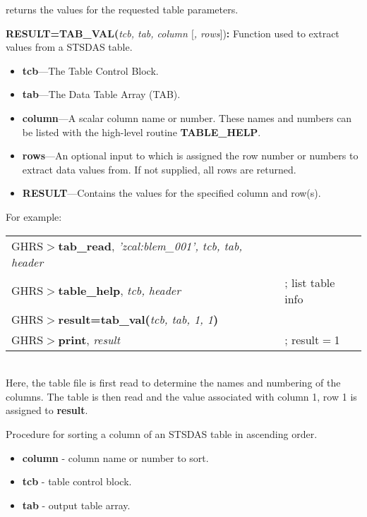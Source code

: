 \begin{description}
\noindent
returns the values for the requested table parameters.
%
\item {\bf RESULT=TAB\_VAL(}{\it tcb, tab, column $[$, rows$]$}){\bf :} 
Function used to extract values from a STSDAS table.
 

\begin{itemize}

\item {\bf tcb}---The Table Control Block.

\item {\bf tab}---The Data Table Array (TAB).

\item {\bf column}---A scalar column name or number.  These names and numbers 
can be listed with the high-level routine {\bf TABLE\_HELP}.

\item {\bf rows}---An optional input to which is assigned the row number or
numbers to extract data values from.  If not supplied, all rows are returned.

\item {\bf RESULT}---Contains the values for the specified column and row(s). 

\end{itemize}

\noindent
For example:\\

\begin{tabular}{ll}
GHRS$>${\bf tab\_read}, {\it 'zcal:blem\_001', tcb, tab, header} & \\
GHRS$>${\bf table\_help}, {\it tcb, header} & ; list table info\\
GHRS$>${\bf result=tab\_val(}{\it tcb, tab, 1, 1}{\bf )} & \\
GHRS$>${\bf print}, {\it result} & ; result$=$1 \\
\end{tabular}\\

\noindent
Here, the table file is first read to determine the names and
numbering of the columns.  The table is then read and the value
associated with column 1, row 1 is assigned to {\bf result}.
%
\newpage
\item [TAB\_SORT, {\it column, TCB, TAB}:]
Procedure 
for sorting a column of an STSDAS table in ascending 
order.

\begin{itemize}
\item	{\bf column} - column name or number to sort.
\item	{\bf tcb} - table control block.
\item	{\bf tab} - output table array.
\end{itemize}
%
\item [TAB\_PUT, {\it column, values, tcb, tab $[$, row$]$} :] 


\end{description}
